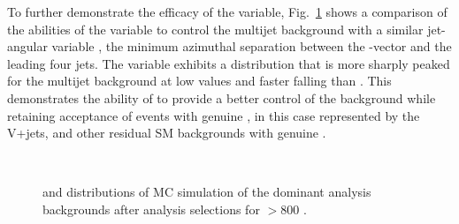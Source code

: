 
To further demonstrate the efficacy of the \bdphi variable,
Fig.~\ref{fig:bDPhi_nominal} shows a comparison of the abilities of
the \bdphi variable to control the \QCD multijet background with a
similar jet-\mht angular variable \dphimhtj, the minimum azimuthal
separation between the \mht-vector and the leading four jets. The
\bdphi variable exhibits a distribution that is more sharply peaked
for the \QCD multijet background at low values and faster falling than
\dphimhtj. This
demonstrates the ability of \bdphi to provide a better control of the
\QCD background while retaining acceptance of events with genuine
\mht, in this case represented by the V+jets, \ttbar and other
residual SM backgrounds with genuine \met. 

\begin{figure}[!h]
 \centering
  \\
 \caption{\bdphi and \dphimhtj distributions of MC simulation of the
 dominant analysis backgrounds
 after analysis selections for \scalht $> 800$ \GeV. }
 \label{fig:bDPhi_nominal}
\end{figure}

